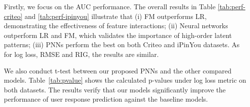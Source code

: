 \documentclass[conference]{IEEEtran}
\begin{document}

Firstly, we focus on the AUC performance. The overall results in Table \ref{tab:perf-criteo} and \ref{tab:perf-ipinyou} illustrate that (i) FM outperforms LR, demonstrating the effectiveness of feature interactions; (ii) Neural networks outperform LR and FM, which validates the importance of high-order latent patterns; (iii) PNNs perform the best on both Criteo and iPinYou datasets. As for log loss, RMSE and RIG, the results are similar.




We also conduct t-test between our proposed PNNs and the other compared models. Table~\ref{tab:pvalue} shows the calculated p-values under log loss metric on both datasets. The results verify that our models significantly improve the performance of user response prediction against the baseline models.




\end{document}
